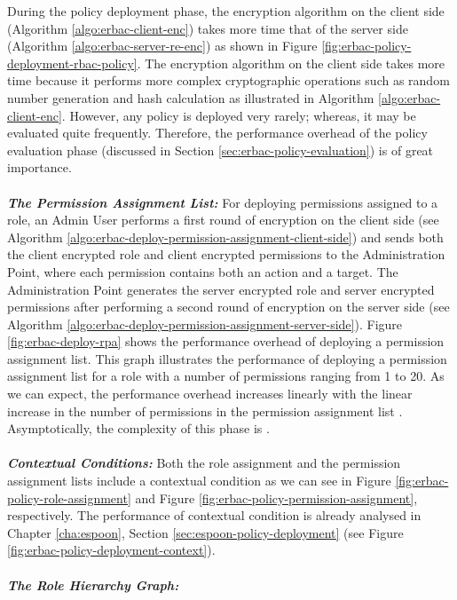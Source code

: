 \documentclass[epsfig,a4paper,11pt,titlepage]{book}
\numberwithin{algorithm}{chapter}
\begin{document}
During the policy deployment phase, the encryption algorithm on the client side (Algorithm \ref{algo:erbac-client-enc}) takes more time that of the server side (Algorithm \ref{algo:erbac-server-re-enc}) as shown in Figure \ref{fig:erbac-policy-deployment-rbac-policy}. The encryption algorithm on the client side takes more time because it performs more complex cryptographic operations such as random number generation and hash calculation as illustrated in Algorithm \ref{algo:erbac-client-enc}. However, any policy is deployed very rarely; whereas, it may be evaluated quite frequently. Therefore, the performance overhead of the policy evaluation phase (discussed in Section \ref{sec:erbac-policy-evaluation}) is of great importance. \\ \\
\noindent \emph{\textbf{The Permission Assignment List:}} 
For deploying permissions assigned to a role, an Admin User performs a first round of encryption on the client side (see Algorithm \ref{algo:erbac-deploy-permission-assignment-client-side}) and sends both the client encrypted role and client encrypted permissions to the Administration Point, where each permission contains both an action and a target. The Administration Point generates the server encrypted role and server encrypted permissions after performing a second round of encryption on the server side (see Algorithm \ref{algo:erbac-deploy-permission-assignment-server-side}). Figure \ref{fig:erbac-deploy-rpa} shows the performance overhead of deploying a permission assignment list. This graph illustrates the performance of deploying a permission assignment list for a role with a number of permissions ranging from 1 to 20. As we can expect, the performance overhead increases linearly with the linear increase in the number of permissions in the permission assignment list . Asymptotically, the complexity of this phase is . \\ \\
\noindent \emph{\textbf{Contextual Conditions:}} 
Both the role assignment and the permission assignment lists include a contextual condition as we can see in Figure \ref{fig:erbac-policy-role-assignment} and Figure \ref{fig:erbac-policy-permission-assignment}, respectively. The performance of contextual condition is already analysed in Chapter \ref{cha:espoon}, Section \ref{sec:espoon-policy-deployment} (see Figure \ref{fig:erbac-policy-deployment-context}). \\ \\
\noindent \emph{\textbf{The Role Hierarchy Graph:}} 
\end{document}

